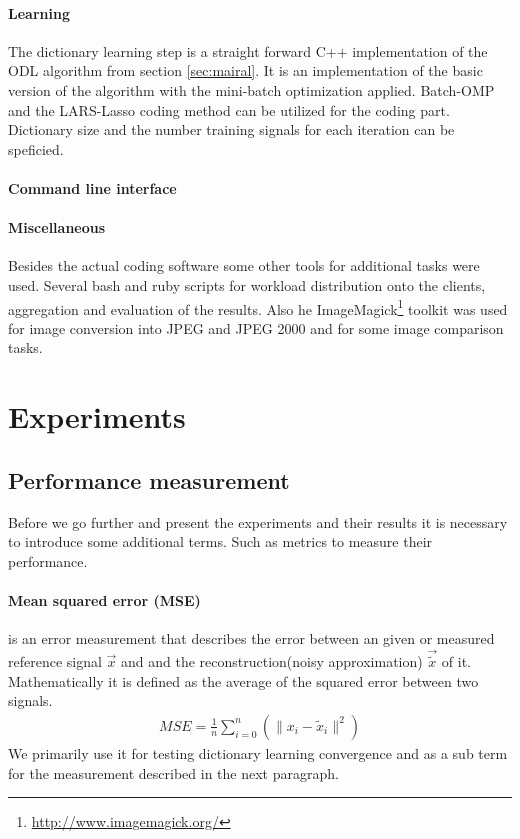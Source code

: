 \paragraph{Learning}
The dictionary learning step is a straight forward C++ implementation of the
ODL algorithm from section \ref{sec:mairal}. It is an
implementation of the
basic version of the algorithm with the mini-batch optimization applied.
Batch-OMP and the LARS-Lasso coding method can be utilized for the coding part.
Dictionary size and the number training signals for each iteration can be
speficied.

\paragraph{Command line interface}
%

\paragraph{Miscellaneous}
Besides the actual coding software some other tools for
additional tasks were used. Several bash and ruby scripts for workload
distribution onto the clients, aggregation and evaluation of the results.
Also he ImageMagick\footnote{\url{http://www.imagemagick.org/}} toolkit was used
for image conversion into JPEG and JPEG 2000 and for some image comparison
tasks.

\section{Experiments}

\subsection{Performance measurement}
Before we go further and present the experiments and their results  it is
necessary to introduce some additional terms. Such as metrics to measure
their performance.

\paragraph{Mean squared error (MSE)} is an error measurement that
describes the error between an given or measured reference signal $\vec{x}$
and and the reconstruction(noisy approximation) $\vec{\tilde{x}}$ of it.
Mathematically it is defined as the average of the squared error between two
signals.
\begin{align}
 MSE = \frac{1}{n} \sum_{i=0}^{n} \left( {\lVert x_i -
\tilde{x}_i\rVert^{2}}\right)
\end{align}
We primarily use it for testing dictionary learning convergence and as a
sub term for the measurement described in the next paragraph.

